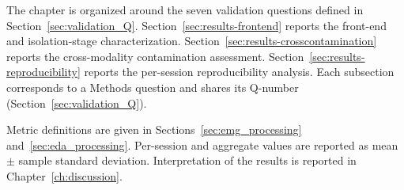 The chapter is organized around the seven validation questions defined in Section~\ref{sec:validation_Q}. Section~\ref{sec:results-frontend} reports the front-end and isolation-stage characterization. Section~\ref{sec:results-crosscontamination} reports the cross-modality contamination assessment. Section~\ref{sec:results-reproducibility} reports the per-session reproducibility analysis. Each subsection corresponds to a Methods question and shares its Q-number (Section~\ref{sec:validation_Q}).

Metric definitions are given in Sections~\ref{sec:emg_processing} and~\ref{sec:eda_processing}. Per-session and aggregate values are reported as mean $\pm$ sample standard deviation. Interpretation of the results is reported in Chapter~\ref{ch:discussion}.

%
%
%
%
%


